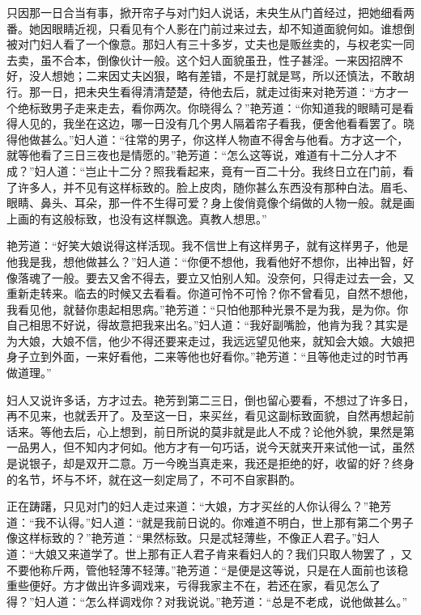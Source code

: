 \documentclass[a4paper,12pt,UTF8,twoside]{ctexbook}
\begin{document}
只因那一日合当有事，掀开帘子与对门妇人说话，未央生从门首经过，把她细看两番。她因眼睛近视，只看见有个人影在门前过来过去，却不知道面貌何如。谁想倒被对门妇人看了一个像意。那妇人有三十多岁，丈夫也是贩丝卖的，与权老实一同去卖，虽不合本，倒像伙计一般。这个妇人面貌虽丑，性子甚淫。一来因招牌不好，没人想她；二来因丈夫凶狠，略有差错，不是打就是骂，所以还慎法，不敢胡行。那一日，把未央生看得清清楚楚，待他去后，就走过街来对艳芳道：“方才一个绝标致男子走来走去，看你两次。你晓得么？”艳芳道：“你知道我的眼睛可是看得人见的，我坐在这边，哪一日没有几个男人隔着帘子看我，便舍他看看罢了。晓得他做甚么。”妇人道：“往常的男子，你这样人物直不得舍与他看。方才这一个，就等他看了三日三夜也是情愿的。”艳芳道：“怎么这等说，难道有十二分人才不成？”妇人道：“岂止十二分？照我看起来，竟有一百二十分。我终日立在门前，看了许多人，并不见有这样标致的。脸上皮肉，随你甚么东西没有那种白法。眉毛、眼睛、鼻头、耳朵，那一件不生得可爱？身上俊俏竟像个绢做的人物一般。就是画上画的有这般标致，也没有这样飘逸。真教人想思。”

艳芳道：“好笑大娘说得这样活现。我不信世上有这样男子，就有这样男子，他是他我是我，想他做甚么？”妇人道：“你便不想他，我看他好不想你，出神出智，好像落魂了一般。要去又舍不得去，要立又怕别人知。没奈何，只得走过去一会，又重新走转来。临去的时候又去看看。你道可怜不可怜？你不曾看见，自然不想他，我看见他，就替你患起相思病。”艳芳道：“只怕他那种光景不是为我，是为你。你自己相思不好说，得故意把我来出名。”妇人道：“我好副嘴脸，他肯为我？其实是为大娘，大娘不信，他少不得还要来走过，我远远望见他来，就知会大娘。大娘把身子立到外面，一来好看他，二来等他也好看你。”艳芳道：“且等他走过的时节再做道理。”

妇人又说许多话，方才过去。艳芳到第二三日，倒也留心要看，不想过了许多日，再不见来，也就丢开了。及至这一日，来买丝，看见这副标致面貌，自然再想起前话来。等他去后，心上想到，前日所说的莫非就是此人不成？论他外貌，果然是第一品男人，但不知内才何如。他方才有一句巧话，说今天就夹开来试他一试，虽然是说银子，却是双开二意。万一今晚当真走来，我还是拒绝的好，收留的好？终身的名节，坏与不坏，就在这一刻定局了，不可不自家斟酌。

正在踌躇，只见对门的妇人走过来道：“大娘，方才买丝的人你认得么？”艳芳道：“我不认得。”妇人道：“就是我前日说的。你难道不明白，世上那有第二个男子像这样标致的？”艳芳道：“果然标致。只是忒轻薄些，不像正人君子。”妇人道：“大娘又来道学了。世上那有正人君子肯来看妇人的？我们只取人物罢了 ，又不要他称斤两，管他轻薄不轻薄。”艳芳道：“是便是这等说，只是在人面前也该稳重些便好。方才做出许多调戏来，亏得我家主不在，若还在家，看见怎么了得？”妇人道：“怎么样调戏你？对我说说。”艳芳道：“总是不老成，说他做甚么。”
\end{document}
